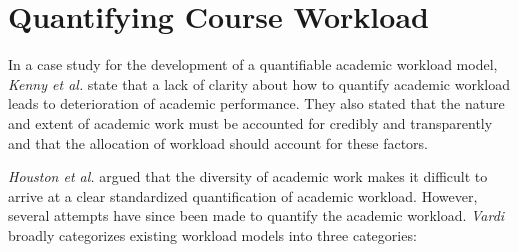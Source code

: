 \section{Quantifying Course Workload}

In a case study for the development of a quantifiable academic workload model, \textit{Kenny et al.} state that a lack of clarity about how to quantify academic workload leads to deterioration of academic performance\cite{kenny2012placing}. They also stated that the nature and extent of academic work must be accounted for credibly and transparently and that the allocation of workload should account for these factors.

\textit{Houston et al.} \cite{houston2006academic} argued that the diversity of academic work makes it difficult to arrive at a clear standardized quantification of academic workload. However, several attempts have since been made to quantify the academic workload. \textit{Vardi} \cite{vardi2009impacts} broadly categorizes existing workload models into three categories:


